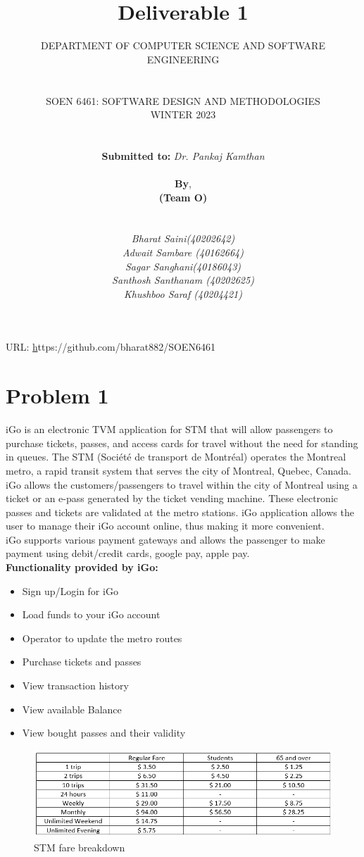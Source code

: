 \documentclass{article}
\title{Deliverable 1 \\}
\author{DEPARTMENT OF COMPUTER SCIENCE AND SOFTWARE ENGINEERING\\\\\\SOEN 6461: SOFTWARE DESIGN AND METHODOLOGIES\\WINTER 2023\\\\\\\textbf{Submitted to:} \textit{Dr. Pankaj Kamthan}\\\\\textbf{By}, \\\textbf{(Team O)}\\\\\\\textit{Bharat Saini(40202642)}\\\textit{Adwait Sambare (40162664)}\\\textit{Sagar Sanghani(40186043)}\\\textit{Santhosh Santhanam (40202625)}\\\textit{Khushboo Saraf (40204421)}}
\date{}
\begin{document}
\maketitle

\begin{center}
\large{URL: \href{}https://github.com/bharat882/SOEN6461{}}
\end{center}

\pagebreak
\tableofcontents
\pagebreak
\listoftables
\pagebreak
\listoffigures
\pagebreak

\section{Problem 1}
iGo is an electronic TVM application for STM that will allow passengers to purchase tickets, passes, and access cards for travel without the need for standing in queues. The STM (Société de transport de Montréal) operates the Montreal metro, a rapid transit system that serves the city of Montreal, Quebec, Canada.  iGo allows the customers/passengers to travel within the city of Montreal using a ticket or an e-pass generated by the ticket vending machine. These electronic passes and tickets are validated at the metro stations. iGo application allows the user to manage their iGo account online, thus making it more convenient. \\
iGo supports various payment gateways and allows the passenger to make payment using debit/credit cards, google pay, apple pay. \\

\textbf{Functionality provided by iGo:} 

\begin{itemize}
\item Sign up/Login for iGo
\item Load funds to your iGo account
\item Operator to update the metro routes
\item Purchase tickets and passes
\item View transaction history
\item View available Balance
\item View bought passes and their validity
\end{itemize} 

 \begin{figure}[h!]
  \includegraphics[scale=1.0]{fare.png}
  \caption{STM fare breakdown}
  \label{fig:fare}
\end{figure}
\end{document}
